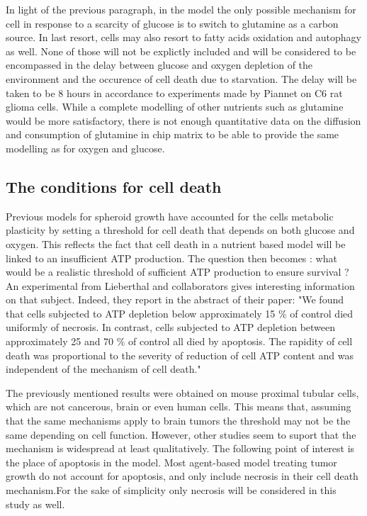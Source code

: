 \documentclass[11pt,a4paper]{article}
\begin{document}
In light of the previous paragraph, in the model the only possible mechanism for cell in response to a scarcity of glucose is to switch to glutamine as a carbon source. In last resort, cells may also resort to fatty acids oxidation and autophagy as well. None of those will not be explictly  included and will be considered to be encompassed in the delay between glucose and oxygen depletion of the environment and the occurence of cell death due to starvation. The delay will be taken to be 8 hours in accordance to experiments made by Piannet on C6 rat glioma cells.\cite{Piannet1991} While a complete modelling of other nutrients such as glutamine would be more satisfactory, there is not enough quantitative data on the diffusion and consumption of glutamine in chip matrix to be able to provide the same modelling as for oxygen and glucose.


\subsection{The conditions for cell death}
Previous models for spheroid growth have accounted for the cells metabolic plasticity by setting a threshold for cell death that depends on both glucose and oxygen.\cite{Kempf2005}\cite{Jagiella2016} This reflects the fact that cell death in a nutrient based model will be linked to an insufficient ATP production. The question then becomes : what would be a realistic threshold of sufficient ATP production to ensure survival ? An experimental from Lieberthal and collaborators gives interesting information on that subject. Indeed, they report in the abstract of their paper: "We found that cells subjected to ATP depletion below approximately 15 \% of control died uniformly of necrosis. In contrast, cells subjected to ATP depletion between approximately 25 and 70 \% of control all died by apoptosis. The rapidity of cell death was proportional to the severity of reduction of cell ATP content and was independent of the mechanism of cell death."\cite{Lieberthal1998}

The previously mentioned  results were obtained on mouse proximal tubular cells, which are not cancerous, brain or even human cells. This means that, assuming that the same mechanisms apply to brain tumors  the threshold may not be the same depending on cell function. However, other studies seem to suport that the mechanism is widespread at least qualitatively.\cite{Martin2001} The following point of interest is the place of apoptosis in the model. Most agent-based model treating tumor growth do not account for apoptosis, and only include necrosis in their cell death mechanism.\cite{Mao2018}\cite{Kempf2005}\cite{Kempf2015}\cite{Bull2020}\cite{Jagiella2016}\cite{Cleri2019}For the sake of simplicity only necrosis will be considered in this study as well.
\end{document}
